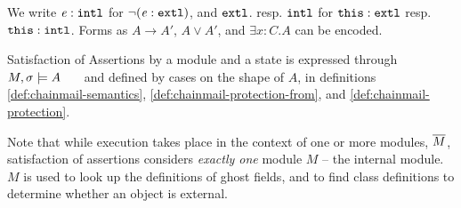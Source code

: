 \forget{
\noindent
\textbf{NOTES}  \notesep %
 Assertions  may contain addresses; \eg   $\alpha.bal > 700$. 
{While addresses make little sense in user-written assertions, they are useful when giving semantics to universal quantifiers 
\cf Def. \ref{def:chainmail-semantics}.(\ref{quant1}), {when the local map changes \eg upon call and return, and in general,} for two-state invariants, \cf Def. \ref{def:necessity-semantics}.(2).}
\notesep The syntax does  not distinguish between fields and ghost fields. For instance, $\prg{a}.\prg{\balance}$ may, in some modules (\eg in \ModA), be a field lookup, while in others (e.g. when the balance is defined though an entry in a lookup table) may involve executing a ghost function. 
}


\begin{definition}[Shorthands] 
{We write $\mathit{e}:\mbox{\normalfont{\texttt{intl}}}$ for $\neg (\mathit{e}:\mbox{\normalfont{\texttt{extl}}})$}, and
$\mbox{\normalfont{\texttt{extl}}}$. resp. {$\mbox{\normalfont{\texttt{intl}}}$} for $\mbox{\normalfont{\texttt{this}}}:\mbox{\normalfont{\texttt{extl}}}$ resp. $\mbox{\normalfont{\texttt{this}}}:\mbox{\normalfont{\texttt{intl}}}$. %
Forms as $A \rightarrow A'$,  $A \vee A'$, and $\exists x:C.A$  can be encoded.
\end{definition}



\label{def:chainmail-semantics-all}
\label{def:chainmail-semantics}
Satisfaction  of Assertions by a module and a state is expressed  through \ \ $M , \sigma \models {A}$ \ \ \ and defined by cases on the shape of $A$, in definitions \ref{def:chainmail-semantics}, \ref{def:chainmail-protection-from}, and 
 \ref{def:chainmail-protection}.

\noindent
Note that while execution takes place in the context of one or more modules, $\overline{M}$, satisfaction of assertions considers \emph{exactly one} module  $M$ -- the internal module. 
{$M$} is used %
 to look up the definitions of ghost fields, and to find class definitions to determine whether an object is  external.

